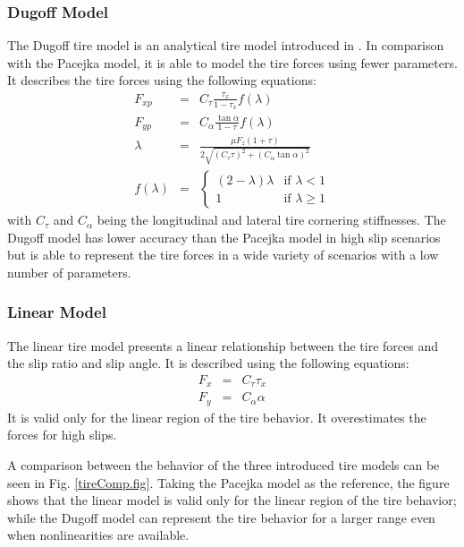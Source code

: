\documentclass[journal]{IEEEtran}
\begin{document}
\subsubsection{Dugoff Model}
The Dugoff tire model is an analytical tire model introduced in \cite{dugoff_tire_1969}. In comparison with the Pacejka model, it is able to model the tire forces using fewer parameters. It describes the tire forces using the following equations:
\begin{subequations}\label{dugoff.eq}
\begin{eqnarray}
    F_{xp} &=& C_\tau \frac{\tau_x}{1-\tau_x} f(\lambda) \\
    F_{yp} &=& C_\alpha \frac{\tan\alpha}{1-\tau} f(\lambda) \\
    \lambda &=& \frac{\mu F_z (1+\tau)}{2 \sqrt{(C_\tau\tau)^2+(C_\alpha\tan\alpha)^2}} \\
    f(\lambda) &=& \begin{cases} (2-\lambda)\lambda & \text{if $\lambda < 1$}\\
                                1 & \text{if $\lambda \geq 1$}
    \end{cases}
\end{eqnarray}
\end{subequations}
with $C_\tau$ and $C_\alpha$ being the longitudinal and lateral tire cornering stiffnesses.
The Dugoff model has lower accuracy than the Pacejka model in high slip scenarios but is able to represent the tire forces in a wide variety of scenarios with a low number of parameters. 

\subsubsection{Linear Model}
The linear tire model presents a linear relationship between the tire forces and the slip ratio and slip angle.  It is described using the following equations: 
\begin{subequations}\label{linear.eq}
    \begin{eqnarray}
        F_x &=& C_\tau \tau_x \\
        F_y &=& C_\alpha \alpha 
    \end{eqnarray}
\end{subequations}
It is valid only for the linear region of the tire behavior. It overestimates the forces for high slips.

A comparison between the behavior of the three introduced tire models can be seen in Fig. \mbox{\ref{tireComp.fig}}. Taking the Pacejka model as the reference, the figure shows that the linear model is valid only for the linear region of the tire behavior; while the Dugoff model can represent the tire behavior for a larger range even when nonlinearities are available.
\end{document}
